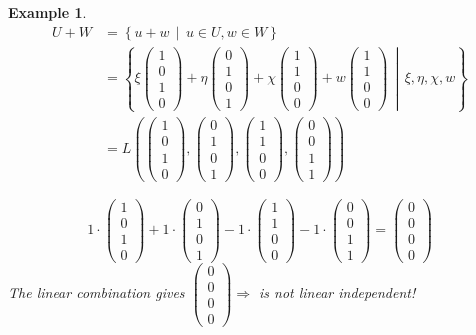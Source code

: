 \documentclass[a4paper,landscape,twocolumn]{article}
\newcommand\setdef[2]{\left\{#1\,\middle|\,#2\right\}}
\newcommand\vecfour[4]{\begin{pmatrix} #1 \\ #2 \\ #3 \\ #4 \end{pmatrix}}
\newtheorem{ex}{Example}
\begin{document}
\begin{ex}
  \begin{align*}
    U+W
    &= \setdef{u+w}{u \in U, w \in W} \\
    &= \setdef{
        \xi \begin{pmatrix} 1 \\ 0 \\ 1 \\ 0 \end{pmatrix} +
        \eta \begin{pmatrix} 0 \\ 1 \\ 0 \\ 1 \end{pmatrix} +
        \chi \begin{pmatrix} 1 \\ 1 \\ 0 \\ 0 \end{pmatrix} +
        w \begin{pmatrix} 1 \\ 1 \\ 0 \\ 0 \end{pmatrix}
      }{\xi, \eta, \chi, w} \\
    &= L\left(\begin{pmatrix} 1 \\ 0 \\ 1 \\ 0 \end{pmatrix},
        \begin{pmatrix} 0 \\ 1 \\ 0 \\ 1 \end{pmatrix},
        \begin{pmatrix} 1 \\ 1 \\ 0 \\ 0 \end{pmatrix},
        \begin{pmatrix} 0 \\ 0 \\ 1 \\ 1 \end{pmatrix}\right)
  \end{align*}

  \[ 1 \cdot \vecfour 1010 + 1 \cdot \vecfour 0101 - 1 \cdot \vecfour 1100 - 1 \cdot \vecfour 0011 = \vecfour 0000 \]
  The linear combination gives $\vecfour 0000 \Rightarrow$ is not linear independent!


\end{ex}
\end{document}
